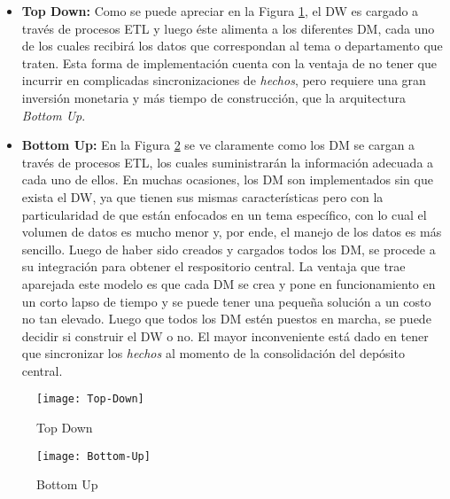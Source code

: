 \documentclass[a4paper,11pt]{article}
\begin{document}
    \begin{itemize}
      \item \textbf{Top Down:} Como se puede apreciar en la Figura \ref{top_down}, el DW es cargado a través de procesos ETL y luego éste alimenta a los
      diferentes DM, cada uno de los cuales recibirá los datos que correspondan al tema o departamento que traten. Esta forma de implementación cuenta
      con la ventaja de no tener que incurrir en complicadas sincronizaciones de \textit{hechos}, pero requiere una gran inversión monetaria y más tiempo de
      construcción, que la arquitectura \textit{Bottom Up}.
      \item \textbf{Bottom Up:} En la Figura \ref{bottom_up} se ve claramente como los DM se cargan a través de procesos ETL, los cuales suministrarán la
      información adecuada a cada uno de ellos. En muchas ocasiones, los DM son implementados sin que exista el DW, ya que tienen sus mismas 
      características pero con la particularidad de que están enfocados en un tema específico, con lo cual el volumen de datos es mucho menor y, por ende,
      el manejo de los datos es más sencillo. Luego de haber sido creados y cargados todos los DM, se procede a su integración para obtener el
      respositorio central. La ventaja que trae aparejada este modelo es que cada DM se crea y pone en funcionamiento en un corto lapso de tiempo y se
      puede tener una pequeña solución a un costo no tan elevado. Luego que todos los DM estén puestos en marcha, se puede decidir si construir el DW o no.
      El mayor inconveniente está dado en tener que sincronizar los \textit{hechos} al momento de la consolidación del depósito central.
    \end{itemize}
    
    \begin{figure}
      \begin{center}
        \texttt{[image: Top-Down]}
        \caption{Top Down} \cite[p.~74]{hefestov2}
        \label{top_down}
      \end{center}
    \end{figure}
    
    \begin{figure}
      \begin{center}
        \texttt{[image: Bottom-Up]}
        \caption{Bottom Up} \cite[p.~74]{hefestov2}
        \label{bottom_up}
      \end{center}
    \end{figure}
    
\end{document}
